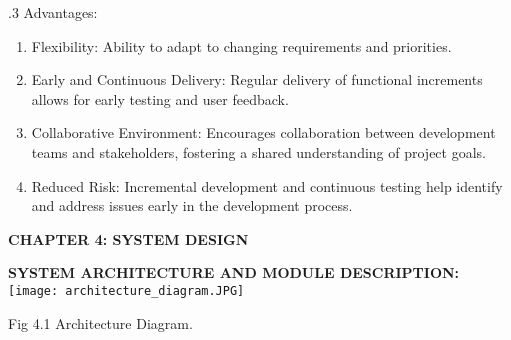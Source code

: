 \documentclass[12pt]{article}
\begin{document}
.3 Advantages:
\begin{enumerate}
\item Flexibility: Ability to adapt to changing requirements and priorities.
\item Early and Continuous Delivery: Regular delivery of functional increments allows for early testing and user feedback.
\item Collaborative Environment: Encourages collaboration between development teams and stakeholders, fostering a shared understanding of project goals.
\item Reduced Risk: Incremental development and continuous testing help identify and address issues early in the development process.
\end{enumerate}

\pagebreak{}

 \begin{center} \fontsize{14}{14} \textbf{CHAPTER 4: SYSTEM DESIGN } \end{center}

\bigskip
\justify \textbf{\fontsize{12}{12} SYSTEM ARCHITECTURE AND MODULE DESCRIPTION: }\\
\noindent \justify \texttt{[image: architecture\_diagram.JPG]}
 \begin{center}
     Fig 4.1 Architecture Diagram.
 \end{center}
\end{document}
